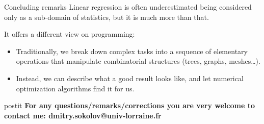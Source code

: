 \documentclass[UKenglish,aspectratio=169]{beamer}
\begin{document}
\begin{frame}{Concluding remarks}
Linear regression is often underestimated being considered only as a sub-domain of statistics, but it is much more than that.

\vspace{2ex}

It offers a different view on programming:
\begin{itemize}
\item Traditionally, we break down complex tasks into a sequence of elementary operations that manipulate combinatorial structures (trees, graphs, meshes\dots).
\item Instead, we can describe what a good result looks like, and let numerical optimization algorithms find it for us.
\end{itemize}

\vspace{4ex}


\begin{beamercolorbox}[sep=1em,wd=\linewidth]{postit}
\centering
\textbf{For any questions/remarks/corrections you are very welcome to contact me: dmitry.sokolov@univ-lorraine.fr}
\end{beamercolorbox}


\end{frame}

\end{document}
